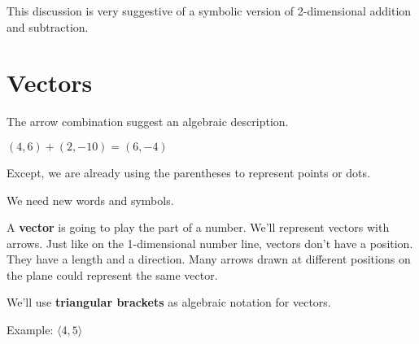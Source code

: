 \documentclass{ximera}
\begin{document}
This discussion is very suggestive of a symbolic version of 2-dimensional addition and subtraction.







\section{Vectors}


The arrow combination suggest an algebraic description.

$(4,6) + (2, -10) = (6, -4)$



Except, we are already using the parentheses to represent points or dots.




\begin{image}
\end{image}




We need new words and symbols.




A \textbf{vector} is going to play the part of a number.  We'll represent vectors with arrows. Just like on the 1-dimensional number line, vectors don't have a position.  They have a length and a direction.  Many arrows drawn at different positions on the plane could represent the same vector.

We'll use \textbf{triangular brackets} as algebraic notation for vectors. 

Example:  $\langle 4, 5 \rangle$
\end{document}
